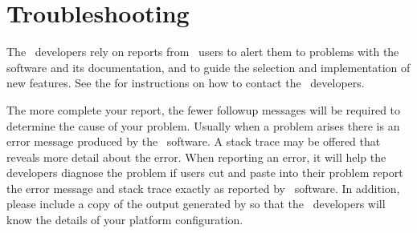 
\section{Troubleshooting}\label{sec:trouble}

The \OOMMF\ developers rely on reports from \OOMMF\ users to alert them
to problems with the software and its
documentation, and to guide the selection and implementation of new
features.  See the  for instructions on how to contact the
\OOMMF\ developers.

The more complete your report, the fewer followup messages will
be required to determine the cause of your problem.  Usually
when a problem arises there is an error message produced by the
\OOMMF\ software.  A stack trace may be offered that reveals more
detail about the error.  When reporting an error, it will help the
developers diagnose the problem if users cut and paste into their
problem report the error message and stack trace exactly as reported by
\OOMMF\ software.  In addition, please include a copy of the output
generated by  so that the
\OOMMF\ developers will know the details of your platform configuration.

